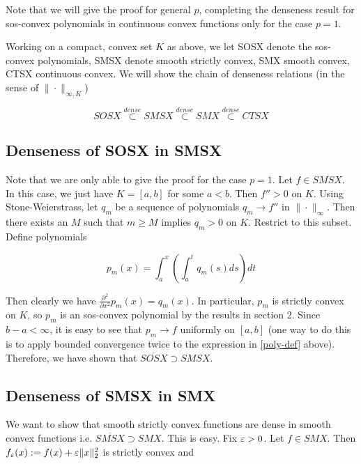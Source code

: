 \documentclass[11pt,reqno]{amsart}
\numberwithin{equation}{section}
\newcommand{\lft}{\left(}
\newcommand{\rt}{\right)}
\newcommand{\pa}{\partial}
\begin{document}
Note that we will give the proof for general $p$, completing the denseness result for sos-convex polynomials in continuous convex functions only for the case $p = 1$. 

\proof Working on a compact, convex set $K$ as above, we let SOSX denote the sos-convex polynomials, SMSX denote smooth strictly convex, SMX smooth convex, CTSX continuous convex. We will show the chain of denseness relations (in the sense of $\| \cdot \|_{\infty, K}$)

\begin{equation} \label{dense-relation}
SOSX \overset{dense}{\subset} SMSX \overset{dense}{\subset} SMX \overset{dense}{\subset} CTSX 
\end{equation}

\subsection{Denseness of SOSX in SMSX} Note that we are only able to give the proof for the case $p =1$. Let $f \in SMSX$. In this case, we just have $K = [a,b]$ for some $a < b$. Then $f'' > 0$ on $K$. Using Stone-Weierstrass, let $q_m$ be a sequence of polynomials $q_m \to f''$ in $\| \cdot \|_{\infty}$. Then there exists an $M$ such that $m \geq M$ implies $q_m > 0$ on $K$. Restrict to this subset. \\

Define polynomials 

\begin{equation} \label{poly-def}
p_m(x) = \int_a^x \lft \int_a^t q_m(s) ds \rt dt 
\end{equation}

Then clearly we have $\frac{\pa^2}{\pa x^2} p_m(x) = q_m(x)$. In particular, $p_m$ is strictly convex on $K$, so $p_m$ is an sos-convex polynomial by the results in section 2. Since $b - a < \infty$, it is easy to see that $p_m \to f$ uniformly on $[a,b]$ (one way to do this is to apply bounded convergence twice to the expression in \eqref{poly-def} above). \\

Therefore, we have shown that $\overline{SOSX} \supset SMSX$. 

\subsection{Denseness of SMSX in SMX} We want to show that smooth strictly convex functions are dense in smooth convex functions i.e. $ \overline{SMSX} \supset SMX$. This is easy. Fix $\varepsilon > 0$. Let $f \in SMX$. Then $f_{\varepsilon}(x) := f(x) + \varepsilon \|x \|_2^2$ is strictly convex and 
\end{document}
